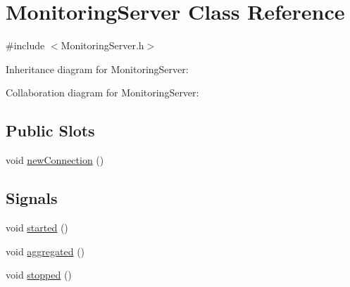 \hypertarget{class_monitoring_server}{}\section{Monitoring\+Server Class Reference}
\label{class_monitoring_server}


{\ttfamily \#include $<$Monitoring\+Server.\+h$>$}



Inheritance diagram for Monitoring\+Server\+:


Collaboration diagram for Monitoring\+Server\+:
\subsection*{Public Slots}
\begin{DoxyCompactItemize}
\item 
void \hyperlink{class_monitoring_server_a54ae4688c3cb974fdb690f095b9ef5cf}{new\+Connection} ()
\end{DoxyCompactItemize}
\subsection*{Signals}
\begin{DoxyCompactItemize}
\item 
void \hyperlink{class_monitoring_server_a2e115786d37661f8b68d4ffd9e6f81a7}{started} ()
\item 
void \hyperlink{class_monitoring_server_af90198642c809ec801d07afa789a6869}{aggregated} ()
\item 
void \hyperlink{class_monitoring_server_a5884af90abe908f8dc09cb540d738559}{stopped} ()
\end{DoxyCompactItemize}
